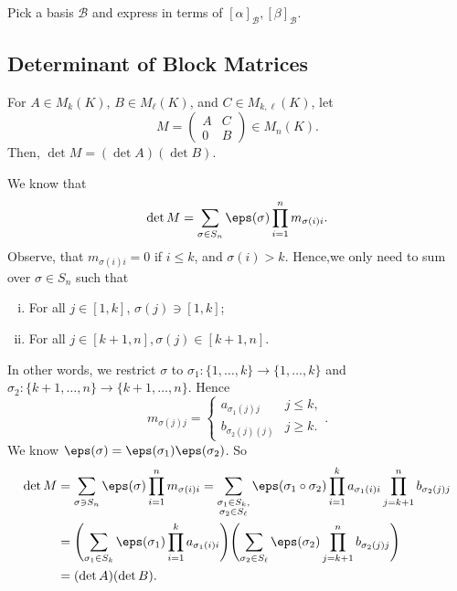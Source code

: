 \documentclass[12pt]{article}
\begin{document}
\begin{proofbox}
	Pick a basis $\mathcal{B}$ and express in terms of $[\alpha]_{\mathcal{B}}, [\beta]_{\mathcal{B}}$.
\end{proofbox}

\subsection{Determinant of Block Matrices}%
\label{sub:determinant_of_block_matrices}

\begin{lemma}
	For $A \in M_{k}(K)$, $B \in M_{\ell}(K)$, and $C \in M_{k, \ell}(K)$, let
	\[
	M =
	\begin{pmatrix}
		A & C \\
		0 & B
	\end{pmatrix} \in M_n(K)
	.\]
	Then, $\det M = (\det A)(\det B)$.
\end{lemma}

\begin{proofbox}
	We know that
	\[
		\det M = \sum_{\sigma \in S_n} \eps(\sigma) \prod_{i = 1}^{n} m_{\sigma(i)i}
	.\]
	Observe, that $m_{\sigma(i)i} = 0$ if $i \leq k$, and $\sigma(i) > k$. Hence,we only need to sum over $\sigma \in S_n$ such that
	\begin{enumerate}[(i)]
		\item For all $j \in [1, k]$, $\sigma(j) \ni [1, k]$;
		\item For all $j \in [k+1, n], \sigma(j) \in [k+1,n]$.
	\end{enumerate}
	In other words, we restrict $\sigma$ to $\sigma_1 : \{1, \ldots, k\} \to \{1, \ldots, k\}$ and  $\sigma_2 : \{k+1, \ldots, n\} \to \{k+1, \ldots, n\}$. Hence
	\[
		m_{\sigma(j)j} =
		\begin{cases}
			a_{\sigma_1(j)j} & j \leq k, \\
			b_{\sigma_2(j)(j)} & j \geq k.
		\end{cases}
	.\]
	We know $\eps(\sigma) = \eps(\sigma_1) \eps(\sigma_2)$. So
	\begin{align*}
		\det M &= \sum_{\sigma \ni S_n}\eps(\sigma) \prod_{i = 1}^{n} m_{\sigma(i)i} = \sum_{\substack{\sigma_1 \in S_k, \\ \sigma_2 \in S_{\ell}}}\eps(\sigma_1 \circ \sigma_2) \prod_{i = 1}^{k} a_{\sigma_1(i)i} \prod_{j = k+1}^{n} b_{\sigma_2(j)j} \\
		       &= \Biggl( \sum_{\sigma_1 \in S_k} \eps(\sigma_1) \prod_{i = 1}^{k} a_{\sigma_1(i)i} \Biggr) \Biggl( \sum_{\sigma_2 \in S_{\ell}} \eps(\sigma_2) \prod_{j = k+1}^{n} b_{\sigma_2(j)j} \Biggr) \\
		       &= (\det A)(\det B).
	\end{align*}
\end{proofbox}
\end{document}
